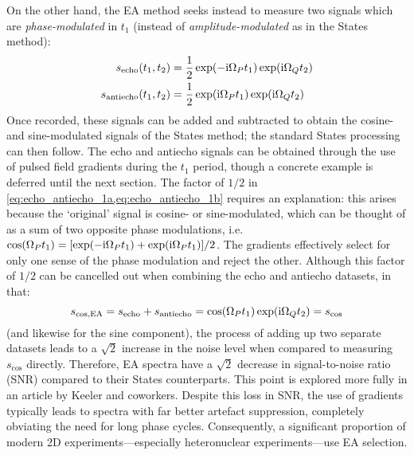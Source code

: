 On the other hand, the EA method seeks instead to measure two signals which are \textit{phase-modulated} in $t_1$ (instead of \textit{amplitude-modulated} as in the States method):
\begin{align}
    s_\text{echo}(t_1, t_2) &= \frac{1}{2}\exp(-\mathrm{i}\Omega_P t_1)\exp(\mathrm{i}\Omega_Q t_2) \label{eq:echo_antiecho_1a} \\
    s_\text{antiecho}(t_1, t_2) &= \frac{1}{2}\exp(\mathrm{i}\Omega_P t_1)\exp(\mathrm{i}\Omega_Q t_2) \label{eq:echo_antiecho_1b}
\end{align}
Once recorded, these signals can be added and subtracted to obtain the cosine- and sine-modulated signals of the States method; the standard States processing can then follow.
The echo and antiecho signals can be obtained through the use of pulsed field gradients during the $t_1$ period, though a concrete example is deferred until the next section.
The factor of $1/2$ in \cref{eq:echo_antiecho_1a,eq:echo_antiecho_1b} requires an explanation: this arises because the `original' signal is cosine- or sine-modulated, which can be thought of as a sum of two opposite phase modulations, i.e.\ $\cos(\Omega_P t_1) = [\exp(-\mathrm{i}\Omega_P t_1) + \exp(\mathrm{i}\Omega_P t_1)]/2$.
The gradients effectively select for only one sense of the phase modulation and reject the other.
Although this factor of $1/2$ can be cancelled out when combining the echo and antiecho datasets, in that:
\begin{equation}
    \label{eq:s_cos_from_antiecho}
    s_\text{cos,EA} = s_\text{echo} + s_\text{antiecho} = \cos(\Omega_P t_1)\exp(\mathrm{i}\Omega_Q t_2) = s_\text{cos}
\end{equation}
(and likewise for the sine component), the process of adding up two separate datasets leads to a $\sqrt{2}$ increase in the noise level when compared to measuring $s_\text{cos}$ directly.
Therefore, EA spectra have a $\sqrt{2}$ decrease in signal-to-noise ratio (SNR) compared to their States counterparts.
This point is explored more fully in an article by Keeler and coworkers.\autocite{Kontaxis1994JMRSA}
Despite this loss in SNR, the use of gradients typically leads to spectra with far better artefact suppression, completely obviating the need for long phase cycles.
Consequently, a significant proportion of modern 2D experiments---especially heteronuclear experiments---use EA selection.

